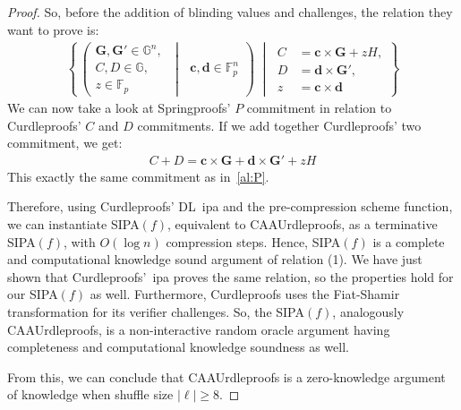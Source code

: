 \begin{proof}
    So, before the addition of blinding values and challenges, the relation they want to prove is:
    \begin{align}
        \left\{
        \, \left(
        \begin{aligned}
            \mathbf{G},\mathbf{G'}\in\mathbb{G}^n,\\
            C,D\in\mathbb{G},\\
            z\in\mathbb{F}_p
        \end{aligned}
        \;\middle|\;
        \begin{aligned}
            \mathbf{c},\mathbf{d}\in\mathbb{F}^n_p
        \end{aligned}
        \right)\;\middle|\;
        \begin{aligned}
            C &= \mathbf{c} \times \mathbf{G}+zH,\\
            D &= \mathbf{d} \times \mathbf{G'},\\
            z &= \mathbf{c} \times \mathbf{d}
        \end{aligned}
        \right\}
    \end{align}
    We can now take a look at Springproofs' $P$ commitment in relation to Curdleproofs' $C$ and $D$ commitments.
    If we add together Curdleproofs' two commitment, we get:
    \begin{align}
        C+D=\mathbf{c} \times \mathbf{G}+\mathbf{d} \times \mathbf{G'}+zH
    \end{align}
    This exactly the same commitment as in~\autoref{al:P}.

    Therefore, using Curdleproofs' DL~\gls{ipa} and the pre-compression scheme function, we can instantiate SIPA$(f)$, equivalent to CAAUrdleproofs, as a terminative SIPA$(f)$, with $O(\log n)$ compression steps.
    Hence, SIPA$(f)$ is a complete and computational knowledge sound argument of relation (1).
    We have just shown that Curdleproofs'~\gls{ipa} proves the same relation, so the properties hold for our SIPA$(f)$ as well.
    Furthermore, Curdleproofs uses the Fiat-Shamir transformation for its verifier challenges.
    So, the SIPA$(f)$, analogously CAAUrdleproofs, is a non-interactive random oracle argument having completeness and computational knowledge soundness as well.

    From this, we can conclude that CAAUrdleproofs is a zero-knowledge argument of knowledge when shuffle size $|\ell|\geq8$.
\end{proof}



